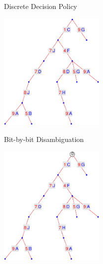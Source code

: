 \begin{tframe}{Discrete Decision Policy}
\begin{center}
\includegraphics[width=2in]{media_minrep/cdiag1}\quad
{}
\end{center}
\end{tframe}

\begin{tframe}{Bit-by-bit Disambiguation}
\begin{center}
\includegraphics[width=2in]{media_minrep/cdiag20}\quad
{}
\end{center}
\end{tframe}

